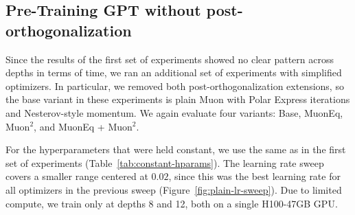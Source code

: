 \documentclass[11pt]{article}
\begin{document}
\subsection{Pre-Training GPT without post-orthogonalization}
\label{sec:Pre-Training-GPT-without-post-orthogonalization}

Since the results of the first set of experiments showed no clear pattern across depths in terms of time, we ran an additional set of experiments with simplified optimizers. In particular, we removed both post-orthogonalization extensions, so the base variant in these experiments is plain Muon with Polar Express iterations and Nesterov-style momentum. We again evaluate four variants: Base, MuonEq, Muon$^2$, and MuonEq + Muon$^2$.

For the hyperparameters that were held constant, we use the same as in the first set of experiments (Table~\ref{tab:constant-hparams}). The learning rate sweep covers a smaller range centered at $0.02$, since this was the best learning rate for all optimizers in the previous sweep (Figure~\ref{fig:plain-lr-sweep}). Due to limited compute, we train only at depths 8 and 12, both on a single H100-47GB GPU.


\begin{table}[t]
    \centering
    \footnotesize
    \setlength{\tabcolsep}{3.5pt}
    \caption{Final validation bpb, training loss, and speed per variant and depth for the baseline without post-orthogonalization extensions. ms/step is the median time for each step. The learning rate for each run was chosen by lowest val bpb from the sweep. Eq = MuonEq, M$^2$ = Muon$^2$.}
    \label{tab:plain-results}
\end{table}
\end{document}
